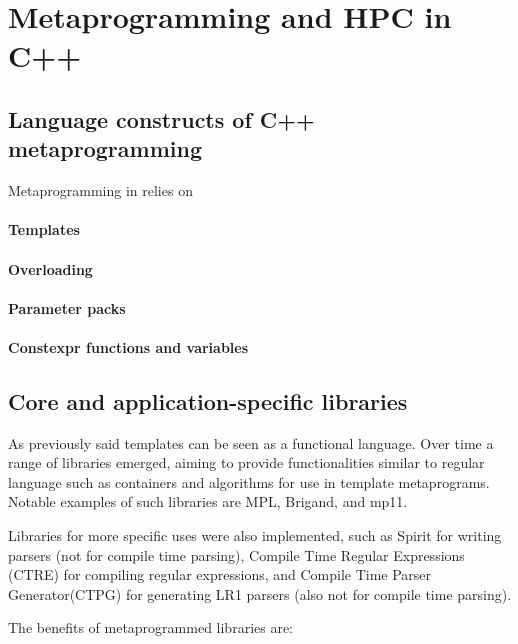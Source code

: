 \documentclass[../../main.tex]{subfiles}
\begin{document}
\section{Metaprogramming and HPC in C++} \label{lbl:meta-cpp}

\subsection{Language constructs of C++ metaprogramming}

Metaprogramming in \cpp relies on

\paragraph{Templates}

\paragraph{Overloading}

\paragraph{Parameter packs}

\paragraph{Constexpr functions and variables}

\subsection{Core and application-specific libraries}

As previously said \cpp templates can be seen as a functional language.
Over time a range of libraries emerged, aiming to provide functionalities
similar to regular language such as containers and algorithms for use in
template metaprograms. Notable examples of such libraries are MPL\cite{mpl},
Brigand\cite{brigand}, and mp11\cite{mp11}.

Libraries for more specific uses were also implemented, such as
Spirit\cite{spirit} for writing parsers (not for compile time parsing),
Compile Time Regular Expressions (CTRE)\cite{ctre}
for compiling regular expressions,
and Compile Time Parser Generator(CTPG)\cite{ctpg}
for generating LR1 parsers (also not for compile time parsing).

The benefits of metaprogrammed libraries are:
\end{document}
